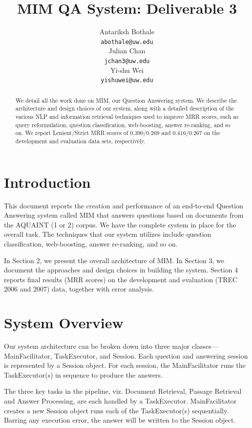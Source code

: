 \documentclass[11pt]{article}
\title{MIM QA System: Deliverable 3}
\author{Antariksh Bothale \\
  {\tt abothale@uw.edu} \\\And
  Julian Chan\\
  {\tt jchan3@uw.edu} \\\And
  Yi-shu Wei\\
  {\tt yishuwei@uw.edu}}
\date{}
\begin{document}
\maketitle
\begin{abstract}
We detail all the work done on MIM, our Question Answering system. We describe the architecture and design choices of our system, along with a detailed description of the various NLP and information retrieval techniques used to improve MRR scores, such as query reformulation, question classification, web-boosting, answer re-ranking, and so on. We report Lenient/Strict MRR scores of 0.390/0.269 and 0.416/0.267 on the development and evaluation data sets, respectively.


\end{abstract}

\section{Introduction}
This document reports the creation and performance of an end-to-end Question Answering system called MIM that answers questions based on documents from the AQUAINT (1 or 2) corpus. We have the complete system in place for the overall task. The techniques that our system utilizes include question classification, web-boosting, answer re-ranking, and so on.

In Section 2, we present the overall architecture of MIM. In Section 3, we document the approaches and design choices in building the system. Section 4 reports final results (MRR scores) on the development and evaluation (TREC 2006 and 2007) data, together with error analysis.

\section{System Overview}

Our system architecture can be broken down into three major classes---MainFacilitator, TaskExecutor, and Session. Each question and answering session is represented by a Session object. For each session, the MainFacilitator runs the TaskExecutor(s) in sequence to produce the answers. 

The three key tasks in the pipeline, viz. Document Retrieval, Passage Retrieval and Answer Processing, are each handled by a TaskExecutor. MainFacilitator creates a new Session object runs each of the TaskExecutor(s) sequentially. Barring any execution error, the answer will be written to the Session object. 
\end{document}
